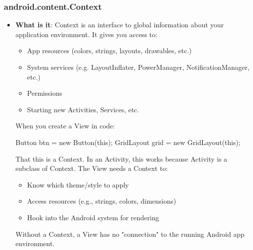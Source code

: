 \documentclass{report}
\begin{document}
    \subsubsection{android.content.Context}
    \begin{itemize}
        \item \textbf{What is it}: Context is an interface to global information about your application environment. It gives you access to:
            \begin{itemize}
                \item App resources (colors, strings, layouts, drawables, etc.)
                \item System services (e.g. LayoutInflater, PowerManager, NotificationManager, etc.)
                \item Permissions
                \item Starting new Activities, Services, etc.
            \end{itemize}
            \bigbreak \noindent 
            When you create a View in code:
            \bigbreak \noindent 
            \begin{javacode}
                Button btn = new Button(this);
                GridLayout grid = new GridLayout(this);
            \end{javacode}
            \bigbreak \noindent 
            That this is a Context. In an Activity, this works because Activity is a subclass of Context.
            \bigbreak \noindent 
            The View needs a Context to:
            \begin{itemize}
                \item Know which theme/style to apply
                \item Access resources (e.g., strings, colors, dimensions)
                \item Hook into the Android system for rendering
            \end{itemize}
            Without a Context, a View has no "connection" to the running Android app environment.
    \end{itemize}


    \pagebreak \bigbreak \noindent 
\end{document}
